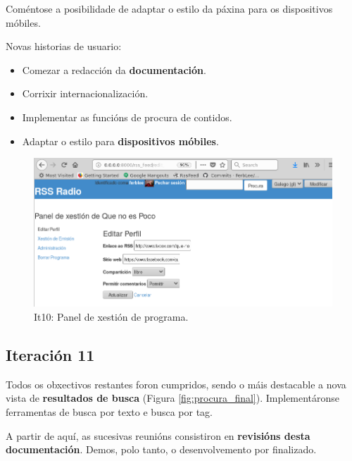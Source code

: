 Coméntose a posibilidade de adaptar o estilo da páxina para os dispositivos móbiles.

Novas historias de usuario:
\begin{itemize}
	\item Comezar a redacción da \textbf{documentación}.
	\item Corrixir internacionalización.
	\item Implementar as funcións de procura de contidos.
	\item Adaptar o estilo para \textbf{dispositivos móbiles}.
\end{itemize}

\begin{figure}[h]
	\centering
	\includegraphics[scale=0.5,keepaspectratio=true]{./images/xestion_final.png}
	\caption{It10: Panel de xestión de programa.}
	\label{fig:xestionl_final}
\end{figure}


\subsection{Iteración 11}


Todos os obxectivos restantes foron cumpridos, sendo o máis destacable a nova vista de \textbf{resultados de busca} (Figura \ref{fig:procura_final}). Implementáronse ferramentas de busca por texto e busca por tag.

A partir de aquí, as sucesivas reunións consistiron en \textbf{revisións desta documentación}. Demos, polo tanto, o desenvolvemento por finalizado.

